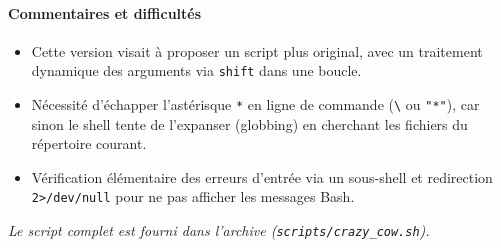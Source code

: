 \documentclass[a4paper,french,11pt]{article}
\begin{document}
\paragraph{Commentaires et difficultés}
\begin{itemize}
  \item Cette version visait à proposer un script plus original, avec un traitement dynamique des arguments via \texttt{shift} dans une boucle.
  \item Nécessité d’échapper l’astérisque \texttt{*} en ligne de commande (\texttt{\textbackslash*} ou \texttt{"*"}), car sinon le shell tente de l’expanser (globbing) en cherchant les fichiers du répertoire courant.
  \item Vérification élémentaire des erreurs d’entrée via un sous-shell et redirection \texttt{2>/dev/null} pour ne pas afficher les messages Bash.
\end{itemize}

\medskip
\noindent\emph{Le script complet est fourni dans l’archive (\texttt{scripts/crazy\_cow.sh}).}
\end{document}
